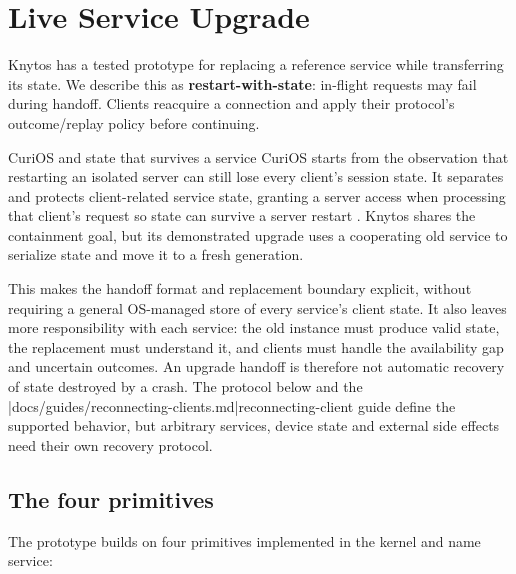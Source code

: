 \chapter{Live Service Upgrade}
\label{chap:live-upgrade}

Knytos has a tested prototype for replacing a reference service while
transferring its state. We describe this as \textbf{restart-with-state}:
in-flight requests may fail during handoff. Clients reacquire a connection and
apply their protocol's outcome/replay policy before continuing.

\begin{architecturalcomparison}{CuriOS and state that survives a service}
CuriOS starts from the observation that restarting an isolated server can
still lose every client's session state. It separates and protects
client-related service state, granting a server access when processing that
client's request so state can survive a server restart \cite{prior:curios}.
Knytos shares the containment goal, but its demonstrated upgrade uses a
cooperating old service to serialize state and move it to a fresh generation.

This makes the handoff format and replacement boundary explicit, without
requiring a general OS-managed store of every service's client state. It also
leaves more responsibility with each service: the old instance must produce
valid state, the replacement must understand it, and clients must handle the
availability gap and uncertain outcomes. An upgrade handoff is therefore not
automatic recovery of state destroyed by a crash. The protocol below and the
\repofiletext|docs/guides/reconnecting-clients.md|{reconnecting-client guide}
define the supported behavior, but arbitrary services, device state and external
side effects need their own recovery protocol.
\end{architecturalcomparison}

\section{The four primitives}

The prototype builds on four primitives implemented in the kernel and name
service:

